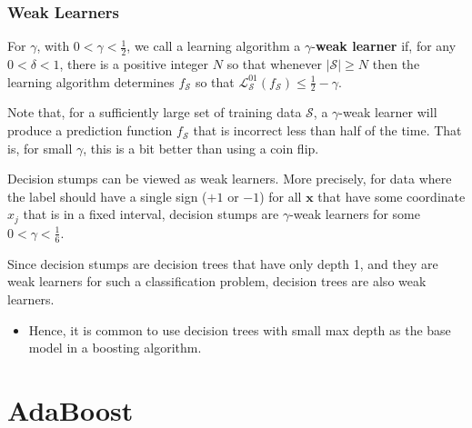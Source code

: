 \documentclass[smaller]{beamer}
\theoremstyle{example}
\newcommand{\x}{\textbf{x}}
\begin{document}
\begin{frame}
    \frametitle{Weak Learners}
    For $\gamma$, with $0 < \gamma < \frac12$, we call a learning algorithm a $\gamma$-\textbf{weak learner} if, for any $0 < \delta < 1$, there is a positive integer $N$ so that whenever $|\mathcal S| \ge N$ then the learning algorithm determines $f_{\mathcal S}$ so that $\mathcal L_{\mathcal S}^{01}(f_{\mathcal S}) \le \frac{1}{2} - \gamma$.

    \pause
    \vspace{12pt}
    Note that, for a sufficiently large set of training data $\mathcal S$, a $\gamma$-weak learner will produce a prediction function $f_{\mathcal S}$ that is incorrect less than half of the time. That is, for small $\gamma$, this is a bit better than using a coin flip.

    \pause
    Decision stumps can be viewed as weak learners. More precisely, for data where the label should have a single sign ($+1$ or $-1$) for all $\x$ that have some coordinate $x_j$ that is in a fixed interval, decision stumps are $\gamma$-weak learners for some $0 < \gamma < \frac16$.

    \pause
    Since decision stumps are decision trees that have only depth 1, and they are weak learners for such a classification problem, decision trees are also weak learners. 
    \begin{itemize}
        \pause
        \item Hence, it is common to use decision trees with small max depth as the base model in a boosting algorithm.
    \end{itemize}
\end{frame}

\section{AdaBoost}
\end{document}
